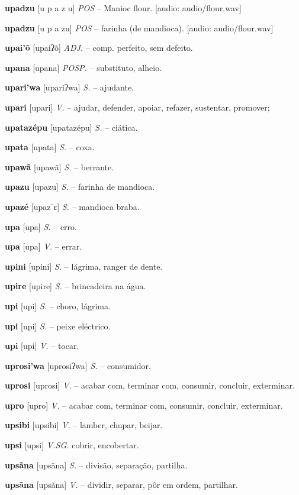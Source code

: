 \textbf{upadzu} [u p a z u] \textit{POS} -- Manioc flour. [audio: audio/flour.wav]{\faHeadphones}

\textbf{upadzu} [u p a zu] \textit{POS} -- farinha (de mandioca). [audio: audio/flour.wav]{\faHeadphones}

\textbf{upai'õ} [upaiʔõ] \textit{ADJ.} -- comp. perfeito, sem defeito.

\textbf{upana} [upana] \textit{POSP.} -- substituto, alheio.

\textbf{upari'wa} [upariʔwa] \textit{S.} -- ajudante.

\textbf{upari} [upari] \textit{V.} -- ajudar, defender, apoiar, refazer, sustentar, promover;

\textbf{upatazépu} [upatazépu] \textit{S.} -- ciática.

\textbf{upata} [upata] \textit{S.} -- coxa.

\textbf{upawã} [upawã] \textit{S.} -- berrante.

\textbf{upazu} [upazu] \textit{S.} -- farinha de mandioca.

\textbf{upazé} [upazˈɛ] \textit{S.} -- mandioca braba.

\textbf{upa} [upa] \textit{S.} -- erro.

\textbf{upa} [upa] \textit{V.} -- errar.

\textbf{upini} [upini] \textit{S.} -- lágrima, ranger de dente.

\textbf{upire} [upire] \textit{S.} -- brincadeira na água.

\textbf{upi} [upi] \textit{S.} -- choro, lágrima.

\textbf{upi} [upi] \textit{S.} -- peixe eléctrico.

\textbf{upi} [upi] \textit{V.} -- tocar.

\textbf{uprosi'wa} [uprosiʔwa] \textit{S.} -- consumidor.

\textbf{uprosi} [uprosi] \textit{V.} -- acabar com, terminar com, consumir, concluir, exterminar.

\textbf{upro} [upro] \textit{V.} -- acabar com, terminar com, consumir, concluir, exterminar.

\textbf{upsibi} [upsibi] \textit{V.} -- lamber, chupar, beijar.

\textbf{upsi} [upsi] \textit{V.SG.} cobrir, encobertar.

\textbf{upsãna} [upsãna] \textit{S.} -- divisão, separação, partilha.

\textbf{upsãna} [upsãna] \textit{V.} -- dividir, separar, pôr em ordem, partilhar.

